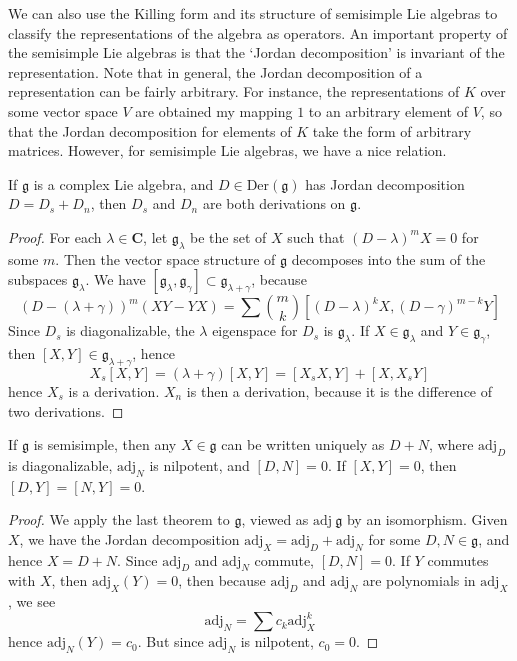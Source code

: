 We can also use the Killing form and its structure of semisimple Lie algebras to classify the representations of the algebra as operators. An important property of the semisimple Lie algebras is that the `Jordan decomposition' is invariant of the representation. Note that in general, the Jordan decomposition of a representation can be fairly arbitrary. For instance, the representations of $K$ over some vector space $V$ are obtained my mapping $1$ to an arbitrary element of $V$, so that the Jordan decomposition for elements of $K$ take the form of arbitrary matrices. However, for semisimple Lie algebras, we have a nice relation.

\begin{lemma}
    If $\mathfrak{g}$ is a complex Lie algebra, and $D \in \text{Der}(\mathfrak{g})$ has Jordan decomposition $D = D_s + D_n$, then $D_s$ and $D_n$ are both derivations on $\mathfrak{g}$.
\end{lemma}
\begin{proof}
    For each $\lambda \in \mathbf{C}$, let $\mathfrak{g}_\lambda$ be the set of $X$ such that $(D - \lambda)^mX = 0$ for some $m$. Then the vector space structure of $\mathfrak{g}$ decomposes into the sum of the subspaces $\mathfrak{g}_\lambda$. We have $[\mathfrak{g}_\lambda, \mathfrak{g}_\gamma] \subset \mathfrak{g}_{\lambda + \gamma}$, because
    \[ (D - (\lambda + \gamma))^m(XY - YX) = \sum {m \choose k} [(D - \lambda)^k X, (D - \gamma)^{m-k} Y] \]
    Since $D_s$ is diagonalizable, the $\lambda$ eigenspace for $D_s$ is $\mathfrak{g}_\lambda$. If $X \in \mathfrak{g}_\lambda$ and $Y \in \mathfrak{g}_\gamma$, then $[X,Y] \in \mathfrak{g}_{\lambda + \gamma}$, hence
    \[ X_s[X,Y] = (\lambda + \gamma)[X,Y] = [X_sX, Y] + [X,X_sY] \]
    hence $X_s$ is a derivation. $X_n$ is then a derivation, because it is the difference of two derivations.
\end{proof}

\begin{theorem}
    If $\mathfrak{g}$ is semisimple, then any $X \in \mathfrak{g}$ can be written uniquely as $D + N$, where $\text{adj}_{D}$ is diagonalizable, $\text{adj}_{N}$ is nilpotent, and $[D,N] = 0$. If $[X,Y] = 0$, then $[D,Y] = [N,Y] = 0$.
\end{theorem}
\begin{proof}
    We apply the last theorem to $\mathfrak{g}$, viewed as $\text{adj}\ \mathfrak{g}$ by an isomorphism. Given $X$, we have the Jordan decomposition $\text{adj}_X = \text{adj}_D + \text{adj}_N$ for some $D,N \in \mathfrak{g}$, and hence $X = D + N$. Since $\text{adj}_D$ and $\text{adj}_N$ commute, $[D,N] = 0$. If $Y$ commutes with $X$, then $\text{adj}_X(Y) = 0$, then because $\text{adj}_D$ and $\text{adj}_N$ are polynomials in $\text{adj}_X$, we see
    \[ \text{adj}_N = \sum c_k \text{adj}^k_X \]
    hence $\text{adj}_N(Y) = c_0$. But since $\text{adj}_N$ is nilpotent, $c_0 = 0$.
\end{proof}

